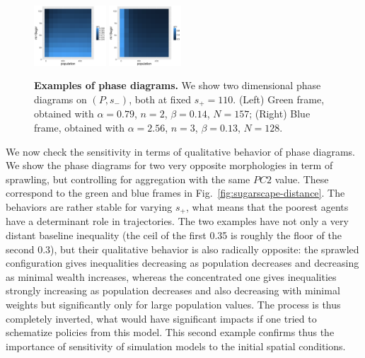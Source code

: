 \documentclass[Afour,sageh,times]{sagej}
\begin{document}
\begin{figure}
\centering
\includegraphics[width=0.24\textwidth]{figures/phasediagram_id27_maxSugar110}
\includegraphics[width=0.24\textwidth]{figures/phasediagram_id0_maxSugar110}
\caption{\textbf{Examples of phase diagrams.} We show two dimensional phase diagrams on $(P,s_-)$, both at fixed $s_+ = 110$. (Left) Green frame, obtained with $\alpha = 0.79$, $n=2$, $\beta = 0.14$, $N=157$; (Right) Blue frame, obtained with $\alpha = 2.56$, $n=3$, $\beta = 0.13$, $N=128$.}
\label{fig:sugarscape-phasediagrams}
\end{figure}

We now check the sensitivity in terms of qualitative behavior of phase diagrams. We show the phase diagrams for two very opposite morphologies in term of sprawling, but controlling for aggregation with the same $PC2$ value. These correspond to the green and blue frames in Fig.~\ref{fig:sugarscape-distance}. The behaviors are rather stable for varying $s_+$, what means that the poorest agents have a determinant role in trajectories. The two examples have not only a very distant baseline inequality (the ceil of the first 0.35 is roughly the floor of the second 0.3), but their qualitative behavior is also radically opposite: the sprawled configuration gives inequalities decreasing as population decreases and decreasing as minimal wealth increases, whereas the concentrated one gives inequalities strongly increasing as population decreases and also decreasing with minimal weights but significantly only for large population values. The process is thus completely inverted, what would have significant impacts if one tried to schematize policies from this model. This second example confirms thus the importance of sensitivity of simulation models to the initial spatial conditions.
\end{document}
